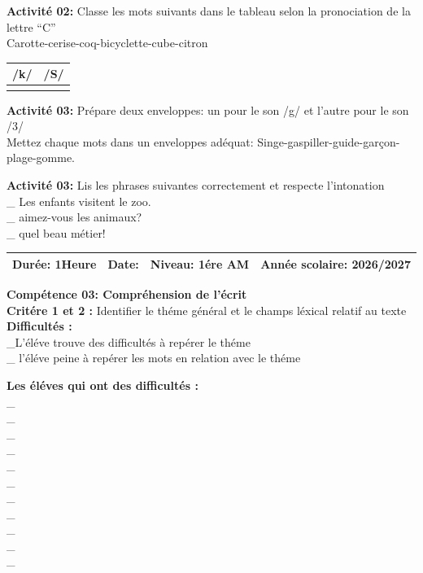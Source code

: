 \documentclass[a4paper,11pt]{article}
\begin{document}
\vspace{3pt}
\noindent\textbf{Activité 02:} Classe les mots suivants dans le tableau selon la pronociation de la lettre ``C''\\
Carotte-cerise-coq-bicyclette-cube-citron

\vspace{2pt}
\noindent
\begin{tabularx}{\textwidth}{|X|X|}
\hline
\textbf{/k/} & \textbf{/S/} \\
\hline
\rule{0pt}{1.8em} & \\
\hline
\end{tabularx}

\vspace{3pt}
\noindent\textbf{Activité 03:} Prépare deux enveloppes: un pour le son /g/ et l'autre pour le son /3/\\
Mettez chaque mots dans un enveloppes adéquat: Singe-gaspiller-guide-garçon-plage-gomme.

\vspace{2pt}
\noindent\textbf{Activité 03:} Lis les phrases suivantes correctement et respecte l'intonation\\
\_ Les enfants visitent le zoo.\\
\_ aimez-vous les animaux?\\
\_ quel beau métier!

\newpage

\noindent
\begin{tabularx}{\textwidth}{|p{3cm}|p{3.5cm}|p{3.5cm}|X|}
\hline
Durée: 1Heure & Date: & Niveau: 1ére AM & Année scolaire: 2026/2027 \\
\hline
\end{tabularx}

\vspace{4pt}
\noindent\textbf{Compétence 03: Compréhension de l'écrit}\\
\textbf{Critére 1 et 2 :} Identifier le théme général et le champs léxical relatif au texte\\
\textbf{Difficultés :}\\
\_L'éléve trouve des difficultés à repérer le théme\\
\_ l'éléve peine à repérer les mots en relation avec le théme

\vspace{3pt}
\noindent\textbf{Les éléves qui ont des difficultés :}\\
\_{}\\[-3pt]
\_{}\\[-3pt]
\_{}\\[-3pt]
\_{}\\[-3pt]
\_{}\\[-3pt]
\_{}\\[-3pt]
\_{}\\[-3pt]
\_{}\\[-3pt]
\_{}\\[-3pt]
\_{}\\[-3pt]
\_{}
\end{document}
